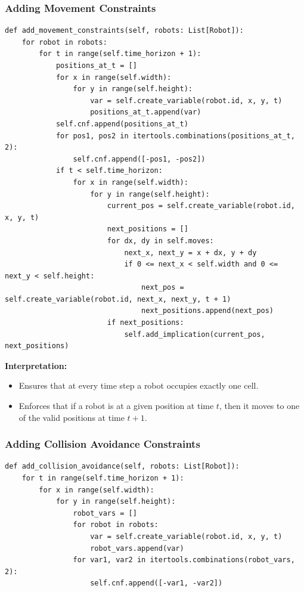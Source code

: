 \documentclass[8pt]{article}
\begin{document}
\subsubsection*{Adding Movement Constraints}
\begin{lstlisting}
def add_movement_constraints(self, robots: List[Robot]):
    for robot in robots:
        for t in range(self.time_horizon + 1):
            positions_at_t = []
            for x in range(self.width):
                for y in range(self.height):
                    var = self.create_variable(robot.id, x, y, t)
                    positions_at_t.append(var)
            self.cnf.append(positions_at_t)
            for pos1, pos2 in itertools.combinations(positions_at_t, 2):
                self.cnf.append([-pos1, -pos2])
            if t < self.time_horizon:
                for x in range(self.width):
                    for y in range(self.height):
                        current_pos = self.create_variable(robot.id, x, y, t)
                        next_positions = []
                        for dx, dy in self.moves:
                            next_x, next_y = x + dx, y + dy
                            if 0 <= next_x < self.width and 0 <= next_y < self.height:
                                next_pos = self.create_variable(robot.id, next_x, next_y, t + 1)
                                next_positions.append(next_pos)
                        if next_positions:
                            self.add_implication(current_pos, next_positions)
\end{lstlisting}

\textbf{Interpretation:}
\begin{itemize}
    \item Ensures that at every time step a robot occupies exactly one cell.
    \item Enforces that if a robot is at a given position at time $t$, then it moves to one of the valid positions at time $t+1$.
\end{itemize}

\subsubsection*{Adding Collision Avoidance Constraints}
\begin{lstlisting}
def add_collision_avoidance(self, robots: List[Robot]):
    for t in range(self.time_horizon + 1):
        for x in range(self.width):
            for y in range(self.height):
                robot_vars = []
                for robot in robots:
                    var = self.create_variable(robot.id, x, y, t)
                    robot_vars.append(var)
                for var1, var2 in itertools.combinations(robot_vars, 2):
                    self.cnf.append([-var1, -var2])
\end{lstlisting}
\end{document}

